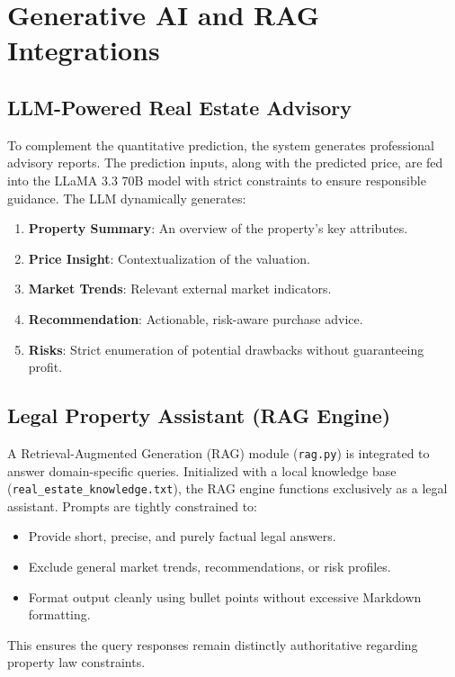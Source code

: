 \documentclass[conference]{IEEEtran}
\begin{document}
\section{Generative AI and RAG Integrations}
\subsection{LLM-Powered Real Estate Advisory}
To complement the quantitative prediction, the system generates professional advisory reports. The prediction inputs, along with the predicted price, are fed into the LLaMA 3.3 70B model with strict constraints to ensure responsible guidance. 
The LLM dynamically generates:
\begin{enumerate}
    \item \textbf{Property Summary}: An overview of the property's key attributes.
    \item \textbf{Price Insight}: Contextualization of the valuation.
    \item \textbf{Market Trends}: Relevant external market indicators.
    \item \textbf{Recommendation}: Actionable, risk-aware purchase advice.
    \item \textbf{Risks}: Strict enumeration of potential drawbacks without guaranteeing profit.
\end{enumerate}

\subsection{Legal Property Assistant (RAG Engine)}
A Retrieval-Augmented Generation (RAG) module (\texttt{rag.py}) is integrated to answer domain-specific queries. Initialized with a local knowledge base (\texttt{real\_estate\_knowledge.txt}), the RAG engine functions exclusively as a legal assistant. 
Prompts are tightly constrained to:
\begin{itemize}
    \item Provide short, precise, and purely factual legal answers.
    \item Exclude general market trends, recommendations, or risk profiles.
    \item Format output cleanly using bullet points without excessive Markdown formatting.
\end{itemize}
This ensures the query responses remain distinctly authoritative regarding property law constraints.
\end{document}
